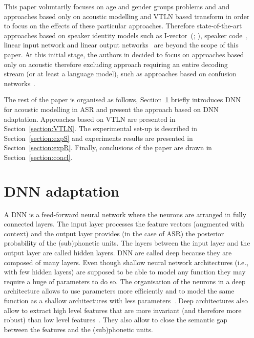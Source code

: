 \documentclass{nle}
\begin{document}
This paper voluntarily focuses on age and gender groups problems and and approaches based only on acoustic modelling and VTLN based transform in order to focus on the effects of these particular approaches. Therefore state-of-the-art approaches based on speaker identity models such as I-vector~(\citealp*{dehak2011front,saon2013speaker}; \citealp{42536}), speaker code~\citep*{abdel2013fast}, linear input network and linear output networks~\citep*{li2010comparison} are beyond the scope of this paper. At this initial stage, the authors in decided to focus on approaches based only on acoustic therefore excluding approach requiring an entire decoding stream (or at least a language model), such as approaches based on confusion networks~\citep*{mangu2000finding}.

The    rest    of    the    paper    is    organised    as    follows,
Section~\ref{section:DNN}   briefly   introduces   DNN  for   acoustic
modelling   in   ASR  and   present   the   approach   based  on   DNN
adaptation.    Approaches   based   on    VTLN   are    presented   in
Section~\ref{section:VTLN}.  The experimental  set-up  is described  in
Section~\ref{section:expS}  and experiments  results are  presented in
Section~\ref{section:expR}.  Finally,  conclusions  of the  paper  are
drawn in Section~\ref{section:concl}.

\section{DNN adaptation}\label{section:DNN}
A DNN is a feed-forward neural network where the neurons are arranged in fully connected layers. The input layer processes the feature vectors (augmented with context) and the output layer provides (in the case of ASR) the posterior probability of the (sub)phonetic units. The layers between the input layer and the output layer are called hidden layers. DNN are called deep because they are composed of many layers. Even though shallow neural network architectures (i.e., with few hidden layers) are supposed to be able to model any function they may require a huge of parameters to do so. The organisation of the neurons in a deep architecture allows to use parameters more efficiently and to model the same function as a shallow architectures with less parameters~\citep*{bengio2013representation}. Deep architectures also allow to extract high level features that are more invariant (and therefore more robust) than low level features~\citep{hinton12}. They also allow to close the 
semantic gap between the features and the (sub)phonetic units. 
\end{document}

